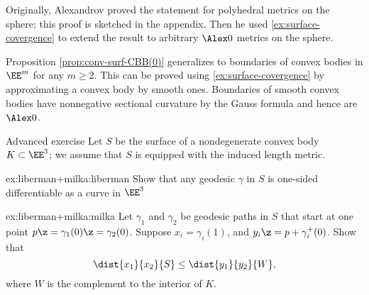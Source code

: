 Originally, Alexandrov proved the statement for polyhedral metrics on the sphere; this proof is sketched in the appendix.
Then he used \ref{ex:surface-covergence} to extend the result to  arbitrary $\Alex0$ metrics on the sphere.

Proposition \ref{prop:conv-surf-CBB(0)} generalizes to boundaries of convex bodies  in $\EE^m$ for any $m\ge 2$.
This can be proved using \ref{ex:surface-covergence} by approximating a convex body by smooth ones.
Boundaries of smooth convex bodies have nonnegative sectional curvature by the Gauss formula and hence are $\Alex0$.


\begin{thm}{Advanced exercise}\label{ex:liberman+milka}
Let $S$ be the surface of a nondegenerate convex body $K\subset\EE^3$;
we assume that $S$ is equipped with the induced length metric.

\begin{subthm}{ex:liberman+milka:liberman}
Show that any geodesic $\gamma$ in $S$ is one-sided differentiable as a curve in $\EE^3$ 
\end{subthm}

\begin{subthm}{ex:liberman+milka:milka}
Let $\gamma_1$ and $\gamma_2$ be geodesic paths in $S$ that start at one point $p\z=\gamma_1(0)\z=\gamma_2(0)$.
Suppose $x_i=\gamma_i(1)$, and $y_i\z=p+\gamma_i^+(0)$.
Show that 
\[\dist{x_1}{x_2}{S}\le \dist{y_1}{y_2}{W},\]
where $W$ is the complement to the interior of $K$.
\end{subthm}

\end{thm}

